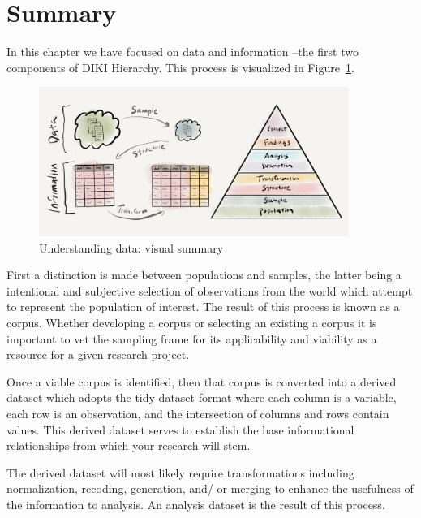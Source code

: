 \documentclass[
  letterpaper,
]{latex/krantz}
\begin{document}
\hypertarget{summary-2}{%
\section*{Summary}\label{summary-2}}

In this chapter we have focused on data and information --the first two
components of DIKI Hierarchy. This process is visualized in
Figure~\ref{fig-understanding-data-vis-sum}.

\begin{figure}

{\centering \includegraphics[width=0.9\textwidth,height=\textheight]{./figures/understanding-data/understanding-data_visual-summary-paper.png}

}

\caption{\label{fig-understanding-data-vis-sum}Understanding data:
visual summary}

\end{figure}

First a distinction is made between populations and samples, the latter
being a intentional and subjective selection of observations from the
world which attempt to represent the population of interest. The result
of this process is known as a corpus. Whether developing a corpus or
selecting an existing a corpus it is important to vet the sampling frame
for its applicability and viability as a resource for a given research
project.

Once a viable corpus is identified, then that corpus is converted into a
derived dataset which adopts the tidy dataset format where each column
is a variable, each row is an observation, and the intersection of
columns and rows contain values. This derived dataset serves to
establish the base informational relationships from which your research
will stem.

The derived dataset will most likely require transformations including
normalization, recoding, generation, and/ or merging to enhance the
usefulness of the information to analysis. An analysis dataset is the
result of this process.
\end{document}
